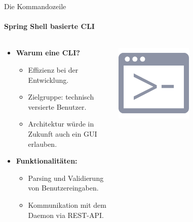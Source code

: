 \documentclass[
    ngerman,%
    authorontitle=true,
]{bfhbeamer}
\begin{document}
    \begin{frame}{Die Kommandozeile}
        \framesubtitle{Spring Shell basierte CLI}
        \begin{columns}
            \begin{column}{0.7\textwidth}
                \begin{itemize}
                    \item \textbf{Warum eine CLI?}
                    \begin{itemize}
                        \item Effizienz bei der Entwicklung.
                        \item Zielgruppe: technisch versierte Benutzer.
                        \item Architektur würde in Zukunft auch ein GUI erlauben.
                    \end{itemize}
                    \item \textbf{Funktionalitäten:}
                    \begin{itemize}
                        \item Parsing und Validierung von Benutzereingaben.
                        \item Kommunikation mit dem Daemon via REST-API\@.
                    \end{itemize}
                \end{itemize}
            \end{column}
            \begin{column}{0.3\textwidth}
                \begin{center}
                    \includegraphics[width=0.5\textwidth]{assets/presentation/prompt}
                \end{center}
            \end{column}
        \end{columns}
    \end{frame}
\end{document}

